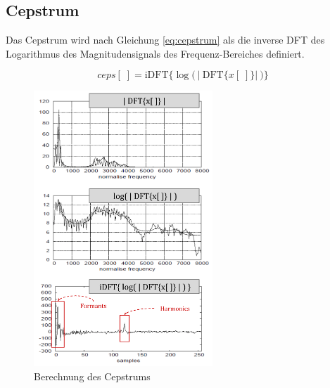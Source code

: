 \subsection{Cepstrum}

Das Cepstrum wird nach Gleichung \ref{eq:cepstrum} als die inverse DFT des Logarithmus des Magnitudensignals des Frequenz-Bereiches definiert. 

\begin{equation}
ceps[\;] =  \text{iDFT}\Big\{ \log \Big(\ \big|\ \text{DFT}\{x[\;]\} \big|\ \Big) \Big\}
\label{eq:cepstrum}
\end{equation}

\begin{figure}[h]
	\centering
	\includegraphics[width=0.6\textwidth]{bilder/cepstrum04.png}
	\caption{Berechnung des Cepstrums}
	\label{img:cepstrumOverview}
\end{figure}	


